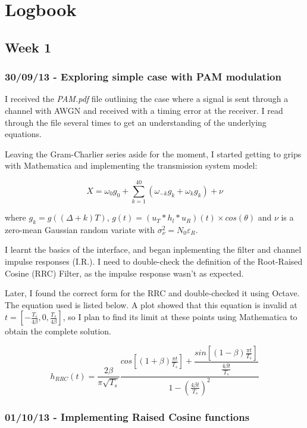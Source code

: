 \chapter{Logbook}

\section{Week 1}

\subsection{30/09/13 - Exploring simple case with PAM modulation}

I received the \emph{PAM.pdf} file outlining the case where a signal is
sent through a channel with AWGN and received with a timing error at the
receiver. I read through the file several times to get an understanding
of the underlying equations.

Leaving the Gram-Charlier series aside for the moment, I started getting
to grips with Mathematica and implementing the transmission system
model:

\[
X = \omega_0 g_0 + \sum_{k=1}^{40} ( \omega_{-k} g_{k} + \omega_k g_k ) + \nu
\]

where $g_k = g((\Delta + k)T)$,
$g(t) = (u_T \ast h_l \ast u_R)(t) \times cos(\theta)$ and $\nu$ is a
zero-mean Gaussian random variate with
$\sigma_{\nu}^2 = N_0 \varepsilon_R$.

I learnt the basics of the interface, and began inplementing the filter
and channel impulse responses (I.R.). I need to double-check the
definition of the Root-Raised Cosine (RRC) Filter, as the impulse
response wasn't as expected.

Later, I found the correct form for the RRC \cite{[12]} and double-checked it using Octave. The equation used is listed below. A plot showed that this equation is invalid at
$t = \left [ - \frac{T_s}{ 4 \beta } , 0 , \frac{T_s}{ 4 \beta } \right ]$,
so I plan to find its limit at these points using Mathematica to obtain
the complete solution.

\[
h_{RRC}(t) = \frac{2 \beta}{\pi \sqrt{T_s}} \frac{cos \left [ (1 + \beta) \frac{\pi t}{T_s} \right ] + \dfrac{sin \left [ (1 - \beta) \frac{\pi t}{T_s} \right ]}{\frac{4 \beta t}{T_s}}}{1 - \left ( \frac{4 \beta t}{T_s} \right )^2}
\]

\subsection{01/10/13 - Implementing Raised Cosine functions}

